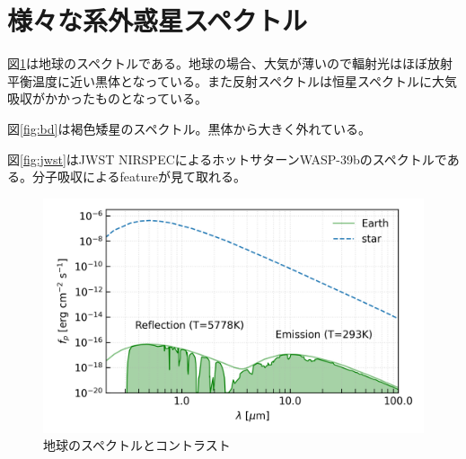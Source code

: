 \section{様々な系外惑星スペクトル}



図\ref{fig:earth}は地球のスペクトルである。地球の場合、大気が薄いので輻射光はほぼ放射平衡温度に近い黒体となっている。また反射スペクトルは恒星スペクトルに大気吸収がかかったものとなっている。

図\ref{fig:bd}は褐色矮星のスペクトル。黒体から大きく外れている。

図\ref{fig:jwst}はJWST NIRSPECによるホットサターンWASP-39bのスペクトルである。分子吸収によるfeatureが見て取れる。


\begin{figure}[]
 \begin{center}
	\includegraphics[width=\linewidth]{fig/EarthEmis.png}
\end{center}
	\caption{地球のスペクトルとコントラスト}
	\label{fig:earth}
\end{figure} 

